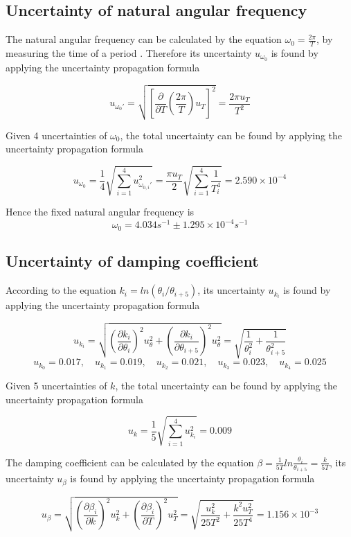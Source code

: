 \documentclass{article}
\begin{document}
\subsection{Uncertainty of natural angular frequency}

The natural angular frequency can be calculated by the equation $\omega_0=\frac{2\pi}{T}$, by measuring the time of a period . Therefore its uncertainty $u_{\omega_0}$ is found by applying the uncertainty propagation formula

$$u_{\omega_0'}=\sqrt{\left[\frac{\partial}{\partial T}\left(\frac{2\pi}{T}\right)u_T\right]^2}=\frac{2\pi u_T}{T^2}$$

Given 4 uncertainties of $\omega_0$, the total uncertainty can be found by applying the uncertainty propagation formula

$$u_{\omega_0}=\frac{1}{4}\sqrt{\sum_{i=1}^4u_{\omega_{0,i}'}^2}=\frac{\pi u_T}{2}\sqrt{\sum_{i=1}^4\frac{1}{T_i^4}}=2.590\times10^{-4}$$

Hence the fixed natural angular frequency is
$$\omega_0=4.034s^{-1}\pm1.295\times10^{-4}s^{-1}$$


\subsection{Uncertainty of damping coefficient}

According to the equation $k_i=ln(\theta_i/\theta_{i+5})$, its uncertainty $u_{k_i}$ is found by applying the uncertainty propagation formula

$$u_{k_i}=\sqrt{\left(\frac{\partial k_i}{\partial\theta_i}\right)^2u_\theta^2+\left(\frac{\partial k_i}{\partial\theta_{i+5}}\right)^2u_\theta^2}
=\sqrt{\frac{1}{\theta_i^2}+\frac{1}{\theta_{i+5}^2}}$$
$$u_{k_0}=0.017,\quad u_{k_1}=0.019,\quad u_{k_2}=0.021,\quad u_{k_3}=0.023,\quad u_{k_4}=0.025$$

Given 5 uncertainties of $k$, the total uncertainty can be found by applying the uncertainty propagation formula

$$u_{k}=\frac{1}{5}\sqrt{\sum_{i=1}^4u_{k_i}^2}=0.009$$

The damping coefficient can be calculated by the equation $\beta=\frac{1}{5T}ln\frac{\theta_i}{\theta_{i+5}}=\frac{k}{5T}$, its uncertainty $u_{\beta}$ is found by applying the uncertainty propagation formula

$$u_{\beta}=\sqrt{\left(\frac{\partial \beta_i}{\partial k}\right)^2u_k^2+\left(\frac{\partial \beta_i}{\partial T}\right)^2u_T^2}
=\sqrt{\frac{u_k^2}{25T^2}+\frac{k^2u_T^2}{25T^4}}=1.156\times10^{-3}$$
\end{document}
